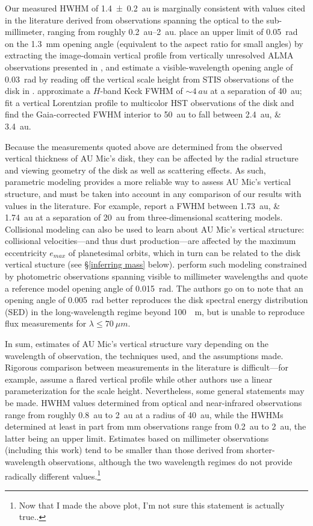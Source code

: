 \documentclass[modern]{aastex62}
\begin{document}
Our measured HWHM of \SI{1.4 \pm 0.2}{au} is marginally consistent with values cited in the literature derived from observations spanning the optical to the sub-millimeter, ranging from roughly \SIrange{0.2}{2}{au}.
\citet{schuppler17} place an upper limit of \SI{0.05}{\radian} on the \SI{1.3}{mm} opening angle (equivalent to the aspect ratio for small angles) by extracting the image-domain vertical profile from vertically unresolved ALMA observations presented in \citet{macgregor13}, and estimate a visible-wavelength opening angle of \SI{0.03}{\radian} by reading off the vertical scale height from STIS observations of the disk in \citet{schneider14}.
\citet{metchev05} approximate a $H$-band Keck FWHM of $\sim \SI{4}{au}$ at a separation of \SI{40}{au};
\citet{krist05} fit a vertical Lorentzian profile to multicolor HST observations of the disk and find the Gaia-corrected FWHM interior to \SI{50}{au} to fall between \SIlist{2.4;3.4}{au}.

Because the measurements quoted above are determined from the observed vertical thickness of AU Mic's disk, they can be affected by the radial structure and viewing geometry of the disk as well as scattering effects. 
As such, parametric modeling provides a more reliable way to assess AU Mic’s vertical structure, and must be taken into account in any comparison of our results with values in the literature.  
For example, \citet{krist05} report a FWHM between \SIlist{1.73;1.74}{au} at a separation of \SI{20}{au} from three-dimensional scattering models.
Collisional modeling can also be used to learn about AU Mic's vertical structure: collisional velocities---and thus dust production---are affected by the maximum eccentricity $e_{max}$ of planetesimal orbits, which in turn can be related to the disk vertical stucture (see \S \ref{inferring mass} below). 
\citet{schuppler17} perform such modeling constrained by photometric observations spanning visible to millimeter wavelengths and quote a reference model opening angle of \SI{0.015}{rad}.
The authors go on to note that an opening angle of \SI{0.005}{rad} better reproduces the disk spectral energy distribution (SED) in the long-wavelength regime beyond \SI{100}{\mu m}, but is unable to reproduce flux measurements for $\lambda \leq \SI{70}{\mu m}$.

In sum, estimates of AU Mic's vertical structure vary depending on the wavelength of observation, the techniques used, and the assumptions made.
Rigorous comparison between measurements in the literature is difficult---for example, \citet{krist05} assume a flared vertical profile while other authors use a linear parameterization for the scale height.
Nevertheless, some general statements may be made.
HWHM values determined from optical and near-infrared observations range from roughly \SI{0.8}{au} to \SI{2}{au} at a radius of \SI{40}{au}, while the HWHMs determined at least in part from mm observations range from \SI{0.2}{au} to \SI{2}{au}, the latter being an upper limit. 
Estimates based on millimeter observations (including this work) tend to be smaller than those derived from shorter-wavelength observations, although the two wavelength regimes do not provide radically different values.\footnote{Now that I made the above plot, I'm not sure this statement is actually true..}
\end{document}
